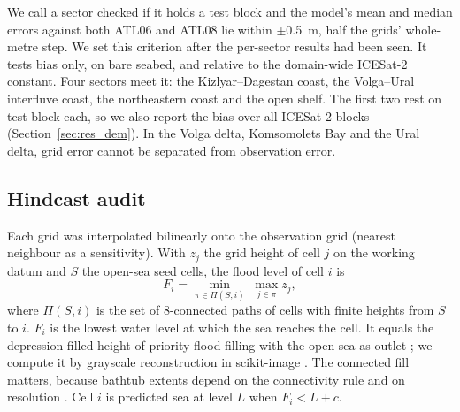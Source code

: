We call a sector checked if it holds a test block and the model's mean and median errors against both ATL06 and ATL08 lie within $\pm$0.5~m, half the grids' whole-metre step. We set this criterion after the per-sector results had been seen. It tests bias only, on bare seabed, and relative to the domain-wide ICESat-2 constant. Four sectors meet it: the Kizlyar--Dagestan coast, the Volga--Ural interfluve coast, the northeastern coast and the open shelf. The first two rest on  test block each, so we also report the bias over all ICESat-2 blocks (Section~\ref{sec:res_dem}).  In the Volga delta, Komsomolets Bay and the Ural delta, grid error cannot be separated from observation error.

\subsection{Hindcast audit}
\label{sec:hindcast}
Each grid was interpolated bilinearly onto the observation grid (nearest neighbour as a sensitivity). With $z_j$ the grid height of cell $j$ on the working datum and $S$ the open-sea seed cells, the flood level of cell $i$ is
\begin{equation}
  F_i = \min_{\pi \in \Pi(S, i)} \; \max_{j \in \pi} z_j ,
  \label{eq:floodlevel}
\end{equation}
where $\Pi(S, i)$ is the set of 8-connected paths of cells with finite heights from $S$ to $i$. $F_i$ is the lowest water level at which the sea reaches the cell. It equals the depression-filled height of priority-flood filling with the open sea as outlet \citep{barnes2014}; we compute it by grayscale reconstruction in scikit-image \citep{vanderwalt2014}. The connected fill matters, because bathtub extents depend on the connectivity rule and on resolution \citep{poulter2008}. Cell $i$ is predicted sea at level $L$ when $F_i < L + c$.

